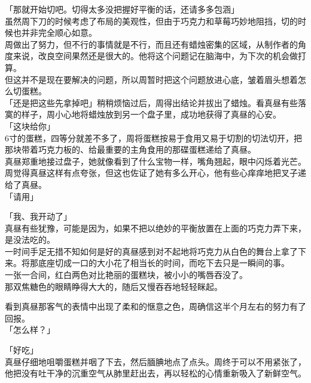 「那就开始切吧。切得太多没把握好平衡的话，还请多多包涵」\\

虽然周下刀的时候考虑了布局的美观性，但由于巧克力和草莓巧妙地阻挡，切的时候也并非完全顺心如意。\\

周做出了努力，但不行的事情就是不行，而且还有蜡烛密集的区域，从制作者的角度来说，改良空间果然还是很大的。他将这个问题记在脑海中，为下次的机会做打算。\\

但这并不是现在要解决的问题，所以周暂时把这个问题放进心底，皱着眉头想着怎么切蛋糕。\\

「还是把这些先拿掉吧」稍稍烦恼过后，周得出结论并拔出了蜡烛。看真昼有些落寞的样子，周小心地将蜡烛放到另一个盘子里，成功地获得了真昼的心安。\\

「这块给你」\\

6寸的蛋糕，四等分就差不多了，周将蛋糕按易于食用又易于切割的切法切开，把那块带着巧克力板的、给最重要的主角食用的那碟蛋糕递给了真昼。\\

真昼郑重地接过盘子，她就像看到了什么宝物一样，嘴角翘起，眼中闪烁着光芒。周觉得真昼这样有点夸张，但这也佐证了她有多么开心，他有些心痒痒地把叉子递给了真昼。\\

「请用」

「我、我开动了」\\

真昼有些犹豫，可能是因为，如果不把以绝妙的平衡放置在上面的巧克力弄下来，是没法吃的。\\

一时间手足无措不知如何是好的真昼感到对不起地将巧克力从白色的舞台上拿了下来。将那底座切成一口的大小花了相当长的时间，而吃下去只是一瞬间的事。\\

一张一合间，红白两色对比艳丽的蛋糕块，被小小的嘴唇吞没了。\\

那双焦糖色的眼睛睁得大大的，随后又慢吞吞地轻轻眯起。

看到真昼那客气的表情中出现了柔和的惬意之色，周确信这半个月左右的努力有了回报。\\

「怎么样？」

「好吃」\\

真昼仔细地咀嚼蛋糕并咽了下去，然后腼腆地点了点头。周终于可以不用紧张了，他把没有吐干净的沉重空气从肺里赶出去，再以轻松的心情重新吸入了新鲜空气。\\

